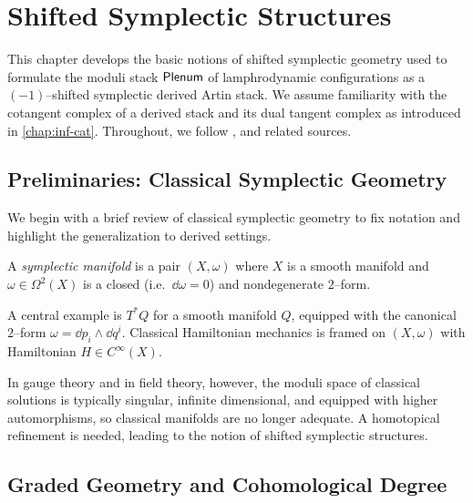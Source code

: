 
\chapter{Shifted Symplectic Structures}
\label{chap:shifted-symplectic}

This chapter develops the basic notions of shifted symplectic geometry used to
formulate the moduli stack $\mathsf{Plenum}$ of lamphrodynamic configurations as a
$(-1)$--shifted symplectic derived Artin stack. We assume familiarity with the
cotangent complex of a derived stack and its dual tangent complex as introduced
in \cref{chap:inf-cat}. Throughout, we follow \cite{PTVV2013}, \cite{Calaque2015}
and related sources.

\section{Preliminaries: Classical Symplectic Geometry}

We begin with a brief review of classical symplectic geometry to fix notation
and highlight the generalization to derived settings.

\begin{definition}
A \emph{symplectic manifold} is a pair $(X,\omega)$ where $X$ is a smooth
manifold and $\omega \in \Omega^2(X)$ is a closed (i.e.\ $\dd\omega = 0$) and
nondegenerate $2$--form.
\end{definition}

A central example is $T^{\ast}Q$ for a smooth manifold $Q$, equipped with the
canonical $2$--form $\omega = \dd p_i \wedge \dd q^i$. Classical Hamiltonian
mechanics is framed on $(X,\omega)$ with Hamiltonian $H\in C^\infty(X)$.

In gauge theory and in field theory, however, the moduli space of classical
solutions is typically singular, infinite dimensional, and equipped with
higher automorphisms, so classical manifolds are no longer adequate. A
homotopical refinement is needed, leading to the notion of shifted symplectic
structures.

\section{Graded Geometry and Cohomological Degree}

